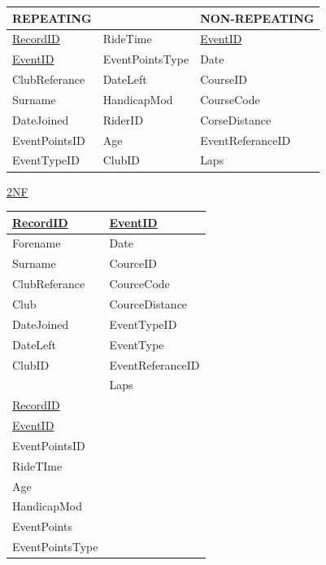 \begin{tabular}{|l l|l|}
\hline
REPEATING           &                 & NON-REPEATING       \\ \hline
\underline{RecordID}& RideTime        & \underline{EventID} \\ \hline
\underline{EventID} & EventPointsType & Date                \\ \hline
ClubReferance       & DateLeft        & CourseID            \\ \hline
Surname             & HandicapMod     & CourseCode          \\ \hline
DateJoined          & RiderID         & CorseDistance       \\ \hline 
EventPointsID       & Age             & EventReferanceID    \\ \hline
EventTypeID         & ClubID          & Laps                \\ \hline
\end{tabular}




\underline{2NF}

\begin{tabular}{|l|l|}
\hline
\underline{RecordID} & \underline{EventID} \\ \hline
Forename             & Date                \\ \hline
Surname              & CourceID            \\ \hline
ClubReferance        & CourceCode          \\ \hline
Club                 & CourceDistance      \\ \hline
DateJoined           & EventTypeID         \\ \hline
DateLeft             & EventType           \\ \hline
ClubID               & EventReferanceID    \\ \hline
                     & Laps                \\ \hline
\underline{RecordID} &                     \\ \hline
\underline{EventID}  &                     \\ \hline 
EventPointsID        &                     \\ \hline
RideTIme             &                     \\ \hline
Age                  &                     \\ \hline
HandicapMod          &                     \\ \hline
EventPoints          &                     \\ \hline
EventPointsType      &                     \\ \hline
\end{tabular}

